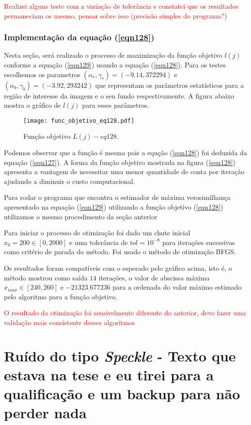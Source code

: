 \textcolor{red}{Realizei alguns teste com a variação de tolerância e constatei que os resultados permaneciam os mesmo, pensar sobre isso (precisão simples do programa?)}

\subsubsection{Implementação da equação (\ref{eqn128})}

Nesta seção, será realizado o processo de maximização da função objetivo $l(j)$ conforme a equação (\ref{eqn129}) usando a equação (\ref{eqn128}). Para os testes escolhemos os parametros $(\alpha_r, \gamma_r)=(-9.14, 372294)$ e $(\alpha_b,\gamma_b)=(-3.92,293242)$ que representam os parâmetros estatísticos para a região de interesse da imagem e o seu fundo respectivamente. A figura abaixo mostra o gráfico de $l(j)$ para esses parâmetros.  

\begin{figure}[hbt]
\centering
\texttt{[image: func\_objetivo\_eq128.pdf]}
	\caption{Função objetivo $L(j) - eq128$.}
\label{fig1}
\end{figure}

Podemos observar que a função é mesma pois a equção (\ref{eqn128}) foi deduzida da equação (\ref{eqn127}). A forma da função  objetivo mostrada na figura (\ref{eqn128}) apresenta a vantagem de necessitar uma menor quantidade de conta por iteração ajudando a diminuir o custo computacional.


Para rodar o programa que encontra o estimador de máxima verosimilhança apresentado na equação (\ref{eqn129}) utilizando a função objetivo (\ref{eqn128}) utilizamos o mesmo procedimento da seção anterior

Para iniciar o processo de otimização foi dado um chute inicial $x_0=200\in[0,2000]$ e uma tolerância de $tol=10^{-8}$ para iterações sucessivas como critério de parada do método. Foi usado o método de otimização BFGS.

Os resultados foram compatíveis com o esperado pelo gráfico acima, isto é, o método mostrou como saída $14$ iterações, o valor de abscissa máxima $x_{max}\in[240,260]$ e $-21323.677236$ para a ordenada do valor máximo estimado pelo algoritmo para a função objetivo.

\textcolor{red}{O resultado da otimização foi sensivelmente diferente do anterior, devo fazer uma validação mais consistente desses algoritmos}


\section{Ruído do tipo {\it Speckle} - Texto que estava na tese e eu tirei para a qualificação e um backup para não perder nada}

